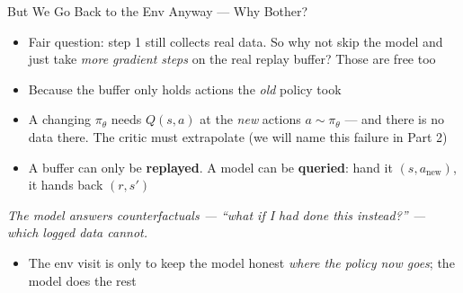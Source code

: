 \begin{frame}{But We Go Back to the Env Anyway --- Why Bother?}
\begin{itemize}
    \item Fair question: step 1 still collects real data. So why not skip the
          model and just take \emph{more gradient steps} on the real replay
          buffer? Those are free too
    \item Because the buffer only holds actions the \emph{old} policy took
    \item A changing $\pi_\theta$ needs $Q(s,a)$ at the \emph{new} actions
          $a \sim \pi_\theta$ --- and there is no data there. The critic must
          extrapolate (we will name this failure in Part 2)
    \item A buffer can only be \textbf{replayed}. A model can be
          \textbf{queried}: hand it $(s, a_{\text{new}})$, it hands back
          $(r, s')$
\end{itemize}
\vspace{0.2em}
\begin{center}
\emph{The model answers counterfactuals --- ``what if I had done \emph{this}
instead?'' --- which logged data cannot.}
\end{center}
\begin{itemize}
    \item The env visit is only to keep the model honest \emph{where the policy
          now goes}; the model does the rest
\end{itemize}
\end{frame}
